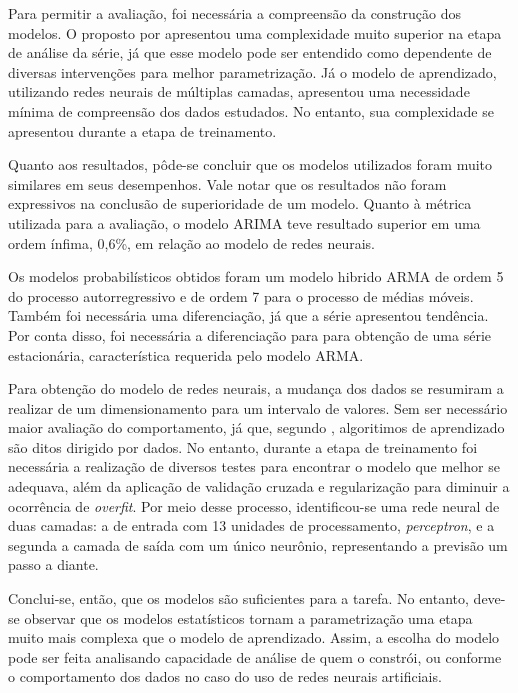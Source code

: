 \documentclass[
    12pt,
    oneside,
    a4paper,
    english,
    brazil
]{abntex2}
\begin{document}
Para  permitir a  avaliação, foi  necessária  a compreensão  da construção  dos
modelos.  O proposto  por   apresentou  uma complexidade  muito
superior na etapa  de análise da série,  já que esse modelo  pode ser entendido
como  dependente  de  diversas  intervenções  para  melhor  parametrização.  Já
o  modelo  de  aprendizado,  utilizando redes  neurais  de  múltiplas  camadas,
apresentou  uma  necessidade mínima  de  compreensão  dos dados  estudados.  No
entanto, sua complexidade se apresentou durante a etapa de treinamento.

Quanto aos resultados,  pôde-se concluir que os modelos  utilizados foram muito
similares  em  seus  desempenhos.  Vale  notar  que  os  resultados  não  foram
expressivos  na conclusão  de  superioridade  de um  modelo.  Quanto à  métrica
utilizada para a avaliação, o modelo ARIMA teve resultado superior em uma ordem
ínfima, 0,6\%, em relação ao modelo de redes neurais.

Os modelos probabilísticos  obtidos foram um modelo hibrido ARMA  de ordem 5 do
processo autorregressivo e de ordem 7  para o processo de médias móveis. Também
foi  necessária uma  diferenciação, já  que a  série apresentou  tendência. Por
conta disso,  foi necessária a  diferenciação para  para obtenção de  uma série
estacionária, característica requerida pelo modelo ARMA\@.

Para obtenção do  modelo de redes neurais,  a mudança dos dados  se resumiram a
realizar de um dimensionamento para um intervalo de valores. Sem ser necessário
maior  avaliação   do  comportamento,  já  que,   segundo  ,
algoritimos de aprendizado são ditos dirigido  por dados. No entanto, durante a
etapa  de treinamento  foi  necessária  a realização  de  diversos testes  para
encontrar  o modelo  que melhor  se adequava,  além da  aplicação de  validação
cruzada e  regularização para  diminuir a  ocorrência de  \textit{overfit}. Por
meio  desse processo,  identificou-se uma  rede neural  de duas  camadas: a  de
entrada com  13 unidades de  processamento, \textit{perceptron}, e a  segunda a
camada de  saída com  um único  neurônio, representando a  previsão um  passo a
diante.

Conclui-se, então,  que os modelos são  suficientes para a tarefa.  No entanto,
deve-se observar que os modelos  estatísticos tornam a parametrização uma etapa
muito mais  complexa que o  modelo de aprendizado.  Assim, a escolha  do modelo
pode ser feita analisando capacidade de análise de quem o constrói, ou conforme
o comportamento dos dados no caso do uso de redes neurais artificiais.
\end{document}
